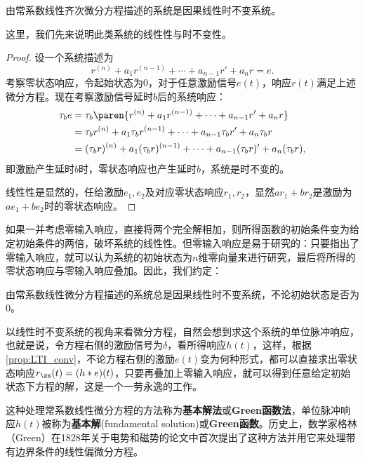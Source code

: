 \begin{proposition}
    由常系数线性齐次微分方程描述的系统是因果线性时不变系统。
\end{proposition}
这里，我们先来说明此类系统的线性性与时不变性。
\begin{proof}
    设一个系统描述为
    \begin{equation}
        r^{(n)}+a_{1}r^{(n-1)}+\cdots +a_{n-1} r'+a_n r=e.
    \end{equation}
    考察零状态响应，令起始状态为$0$，对于任意激励信号$e(t)$，响应$r(t)$满足上述微分方程。现在考察激励信号延时$b$后的系统响应：
    \begin{align}
        \tau_b e&=\tau_b\paren{r^{(n)}+a_{1}r^{(n-1)}+\cdots +a_{n-1} r'+a_n r}\nonumber\\
        &=\tau_b r^{(n)}+a_{1}\tau_b r^{(n-1)}+\cdots +a_{n-1} \tau_b r'+a_n \tau_b r\nonumber\\
        &= (\tau_b r)^{(n)}+a_{1}(\tau_b r)^{(n-1)}+\cdots +a_{n-1} (\tau_b r)'+a_n (\tau_b r),
    \end{align}
    即激励产生延时$b$时，零状态响应也产生延时$b$，系统是时不变的。

    线性性是显然的，任给激励$e_1,e_2$及对应零状态响应$r_1,r_2$，显然$ar_1+br_2$是激励为$ae_1+be_2$时的零状态响应。
\end{proof}
如果一并考虑零输入响应，直接将两个完全解相加，则所得函数的初始条件变为给定初始条件的两倍，破坏系统的线性性。但零输入响应是易于研究的：只要指出了零输入响应，就可以认为系统的初始状态为$n$维零向量来进行研究，最后将所得的零状态响应与零输入响应叠加。因此，我们约定：
\begin{definition}
    由常系数线性微分方程描述的系统总是因果线性时不变系统，不论初始状态是否为$0$。
\end{definition}

以线性时不变系统的视角来看微分方程，自然会想到求这个系统的单位脉冲响应，也就是说，令方程右侧的激励信号为$\delta$，看所得响应$h(t)$，这样，根据\cref{prop:LTI_conv}，不论方程右侧的激励$e(t)$变为何种形式，都可以直接求出零状态响应$r_{\zs}(t)=(h*e)(t)$，只要再叠加上零输入响应，就可以得到任意给定初始状态下方程的解，这是一个一劳永逸的工作。

这种处理常系数线性微分方程的方法称为\textbf{基本解法}或\textbf{Green函数法}，单位脉冲响应$h(t)$被称为\textbf{基本解}(fundamental solution)或\textbf{Green函数}。历史上，数学家格林（Green）在1828年关于电势和磁势的论文中首次提出了这种方法并用它来处理带有边界条件的线性偏微分方程。

